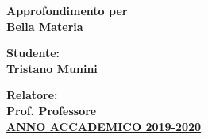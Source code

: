 \documentclass{article}
\begin{document}

\begin{titlepage}
 	\centering
  \Huge{\textbf{Approfondimento per\\ Bella Materia}}\\
 	[25mm]
  \raggedright
  \Large{\textbf{Studente:}}\\
  \Large{\textbf{Tristano Munini}}\\
 	[25mm]
  \raggedright
  \Large{\textbf{Relatore:}}\\
  \Large{\textbf{Prof. Professore}}\\
 	[80mm]
 	\centering
  \LARGE{\underline{\textbf{ANNO ACCADEMICO 2019-2020}}}\\
\end{titlepage}

\tableofcontents
\thispagestyle{empty}
\cleardoublepage
\setcounter{page}{1}




\cleardoublepage


%


\end{document}
